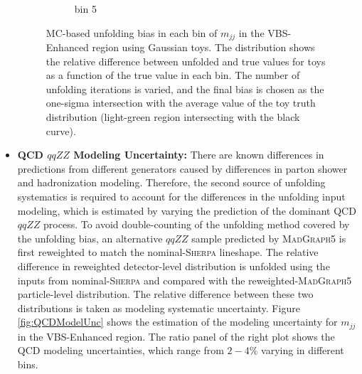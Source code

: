 \begin{itemize}
{\begin{figure}[!htb]
\begin{subfigure}{.48\textwidth}
            \caption{bin 5 }
        \end{subfigure}
        \caption{ MC-based unfolding bias in each bin of $m_{jj}$ in the VBS-Enhanced region using Gaussian toys. The distribution shows the relative difference between unfolded and true values for toys as a function of the true value in each bin. The number of unfolding iterations is varied, and the final bias is chosen as the one-sigma intersection with the average value of the toy truth distribution (light-green region intersecting with the black curve). \label{fig:UnfoldingBias_mjj_VBSEnhanced}}
    \end{figure}

    }

    \item{\textbf{QCD $qqZZ$ Modeling Uncertainty:} There are known differences in predictions from different generators caused by differences in parton shower and hadronization modeling. Therefore, the second source of unfolding systematics is required to account for the differences in the unfolding input modeling, which is estimated by varying the prediction of the dominant QCD $qqZZ$ process. To avoid double-counting of the unfolding method covered by the unfolding bias, an alternative $qqZZ$ sample predicted by \textsc{MadGraph5} is first reweighted to match the nominal-\textsc{Sherpa} lineshape. The relative difference in reweighted detector-level distribution is unfolded using the inputs from nominal-\textsc{Sherpa} and compared with the reweighted-\textsc{MadGraph5} particle-level distribution. The relative difference between these two distributions is taken as modeling systematic uncertainty. Figure \ref{fig:QCDModelUnc} shows the estimation of the modeling uncertainty for $m_{jj}$ in the VBS-Enhanced region. The ratio panel of the right plot shows the QCD modeling uncertainties, which range from $2-4\%$ varying in different bins.
    
}
\end{itemize}
